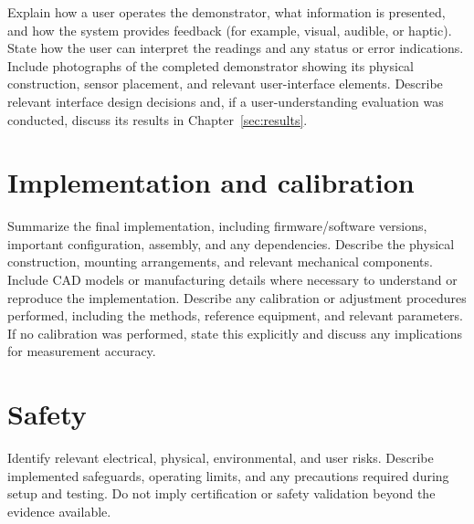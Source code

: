 Explain how a user operates the demonstrator, what information is presented,
and how the system provides feedback (for example, visual, audible, or
haptic). State how the user can interpret the readings and any status or
error indications. Include photographs of the completed demonstrator showing
its physical construction, sensor placement, and relevant user-interface
elements. Describe relevant interface design decisions and, if a
user-understanding evaluation was conducted, discuss its results in
Chapter~\ref{sec:results}.

\section{Implementation and calibration}

Summarize the final implementation, including firmware/software versions,
important configuration, assembly, and any dependencies. Describe the
physical construction, mounting arrangements, and relevant mechanical
components. Include CAD models or manufacturing details where necessary to
understand or reproduce the implementation. Describe any calibration or
adjustment procedures performed, including the methods, reference equipment,
and relevant parameters. If no calibration was performed, state this
explicitly and discuss any implications for measurement accuracy.

\section{Safety}

Identify relevant electrical, physical, environmental, and user risks.
Describe implemented safeguards, operating limits, and any precautions
required during setup and testing. Do not imply certification or safety
validation beyond the evidence available.

